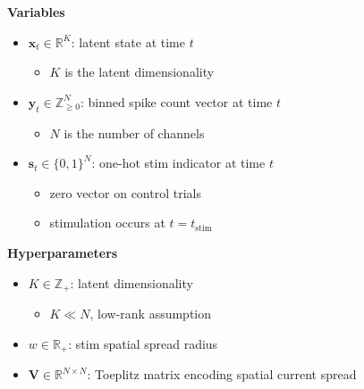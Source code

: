 \documentclass[11pt,letterpaper]{article} %
\begin{document}
\noindent
\begin{minipage}[t]{0.47\textwidth}
\textbf{Variables}
\begin{itemize}[leftmargin=*, itemsep=0em, topsep=0.2em]
    \item $\bm{x}_t \in \mathbb{R}^K$: latent state at time $t$
        \begin{itemize}[itemsep=0em, topsep=0em]
            \item[$-$] $K$ is the latent dimensionality
        \end{itemize}
    \item $\bm{y}_t \in \mathbb{Z}_{\geq 0}^N$: binned spike count vector at time $t$
        \begin{itemize}[itemsep=0em, topsep=0em]
            \item[$-$] $N$ is the number of channels
        \end{itemize}
    \item $\bm{s}_t \in \{0,1\}^N$: one-hot stim indicator at time $t$
        \begin{itemize}[itemsep=0em, topsep=0em]
            \item[$-$] zero vector on control trials
            \item[$-$] stimulation occurs at $t = t_{\mathrm{stim}}$
        \end{itemize}
\end{itemize}

\textbf{Hyperparameters}
\begin{itemize}[leftmargin=*, itemsep=0em, topsep=0.2em]
    \item $K \in \mathbb{Z}_{+}$: latent dimensionality
        \begin{itemize}[itemsep=0em, topsep=0em]
            \item[$-$] $K \ll N$, low-rank assumption
        \end{itemize}
    \item $w \in \mathbb{R}_{+}$: stim spatial spread radius
    \item $\bm{V} \in \mathbb{R}^{N \times N}$: Toeplitz matrix encoding spatial current spread
\end{itemize}
\end{minipage}
\hfill\vline\hfill
\end{document}
